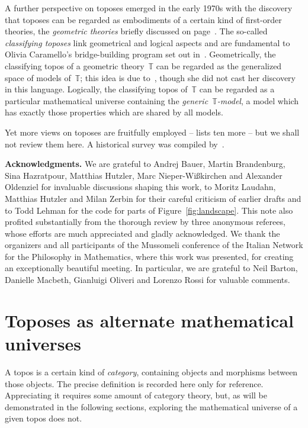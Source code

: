\documentclass[graybox]{svmult}
\newcommand{\TT}{\mathbb{T}}
\renewcommand{\_}{\mathpunct{.}\,}
\newcommand{\?}{\,{:}\,}
\renewcommand{\paragraph}[1]{\noindent\textbf{#1.}}
\begin{document}
A further perspective on toposes emerged in the early 1970s with the discovery
that toposes can be regarded as embodiments of a certain kind of first-order
theories, the \emph{geometric theories} briefly discussed on
page~\pageref{item:classifying-topos}. The so-called \emph{classifying toposes}
link geometrical and logical aspects and are fundamental to Olivia Caramello's
bridge-building program set out in~\cite{caramello:tst}. Geometrically, the classifying
topos of a geometric theory~$\TT$ can be regarded as the generalized space of
models of~$\TT$; this idea is due to~\cite{hakim:relative-schemes}, though she did not cast her discovery in
this language. Logically, the classifying topos of~$\TT$ can be regarded as a
particular mathematical universe containing the \emph{generic~$\TT$-model}, a
model which has exactly those properties which are shared by all models.

Yet more views on toposes are fruitfully employed --
\cite[pages~vii--viii]{johnstone:elephant} lists ten more -- but we shall not review
them here. A historical survey was compiled by~\cite{mclarty:history}.


\bigskip
\paragraph{Acknowledgments} We are grateful to Andrej Bauer, Martin
Brandenburg, Sina Hazratpour, Matthias Hutzler, Marc Nieper-Wißkirchen and
Alexander Oldenziel for invaluable discussions shaping this work, to Moritz
Laudahn, Matthias Hutzler and Milan Zerbin for their careful criticism of
earlier drafts and to Todd Lehman for the code for parts of
Figure~\ref{fig:landscape}. This note also profited substantially from the
thorough review by three anonymous referees, whose efforts are much
appreciated and gladly acknowledged. We thank the organizers and all participants of the
Mussomeli conference of the Italian Network for the Philosophy in Mathematics,
where this work was presented, for creating an exceptionally beautiful meeting. In
particular, we are grateful to Neil Barton, Danielle Macbeth, Gianluigi Oliveri
and Lorenzo Rossi for valuable comments.



\section{Toposes as alternate mathematical universes}

A topos is a certain kind of \emph{category}, containing objects and
morphisms between those objects. The precise definition is recorded here only for
reference. Appreciating it requires some amount of category theory, but, as will be demonstrated in
the following sections, exploring the mathematical universe of a given topos
does not.
\end{document}
